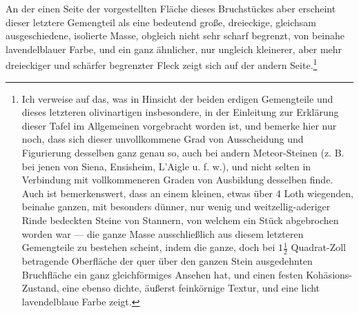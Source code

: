\documentclass[a4paper, 11pt, oneside, german]{article}
\begin{document}
An der einen Seite der vorgestellten Fläche dieses Bruchstückes aber erscheint dieser letztere Gemengteil als eine bedeutend große, dreieckige, gleichsam ausgeschiedene, isolierte Masse, obgleich nicht sehr scharf begrenzt, von beinahe lavendelblauer Farbe, und ein ganz ähnlicher, nur ungleich kleinerer, aber mehr dreieckiger und schärfer begrenzter Fleck zeigt sich auf der andern Seite.\footnote{Ich verweise auf das, was in Hinsicht der beiden erdigen Gemengteile und dieses letzteren olivinartigen insbesondere, in der Einleitung zur Erklärung dieser Tafel im Allgemeinen vorgebracht worden ist, und bemerke hier nur noch, dass sich dieser unvollkommene Grad von Ausscheidung und Figurierung desselben ganz genau so, auch bei andern Meteor-Steinen (z. B. bei jenen von Siena, Ensisheim, L'Aigle u. f. w.), und nicht selten in Verbindung mit vollkommeneren Graden von Ausbildung desselben finde. Auch ist bemerkenswert, dass an einem kleinen, etwas über 4 Loth wiegenden, beinahe ganzen, mit besonders dünner, nur wenig und weitzellig-aderiger Rinde bedeckten Steine von Stannern, von welchem ein Stück abgebrochen worden war --- die ganze Masse ausschließlich aus diesem letzteren Gemengteile zu bestehen scheint, indem die ganze, doch bei $1\frac{1}{2}$ Quadrat-Zoll betragende Oberfläche der quer über den ganzen Stein ausgedehnten Bruchfläche ein ganz gleichförmiges Ansehen hat, und einen festen Kohäsions-Zustand, eine ebenso dichte, äußerst feinkörnige Textur, und eine licht lavendelblaue Farbe zeigt.}
\end{document}

